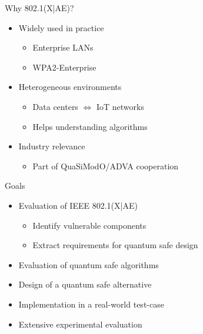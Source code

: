 \documentclass[fleqn,compress,utf8,aspectratio=169,t]{beamer}
\begin{document}
\begin{frame}{Why 802.1(X|AE)?}
  \begin{itemize}
    \item Widely used in practice
    \begin{itemize}
      \item<2-> Enterprise LANs
      \item<2-> WPA2-Enterprise
    \end{itemize}
    \item<3-> Heterogeneous environments
    \begin{itemize}
      \item<4-> Data centers \(\Leftrightarrow\) IoT networks
      \item<4-> Helps understanding algorithms 
    \end{itemize}
    \item<5-> Industry relevance
    \begin{itemize}
      \item<6-> Part of QuaSiModO/ADVA cooperation
    \end{itemize}
  \end{itemize}

\end{frame}


\begin{frame}{Goals}
  \begin{itemize}
    \item<2->  Evaluation of IEEE 802.1(X|AE)
    \begin{itemize}
      \item<3->  Identify vulnerable components
      \item<3->  Extract requirements for quantum safe design
    \end{itemize}
    \item<4-> Evaluation of quantum safe algorithms
    \item<5-> Design of a quantum safe alternative
    \item<6-> Implementation in a real-world test-case
    \item<7-> Extensive experimental evaluation
  \end{itemize}
\end{frame}
\end{document}
